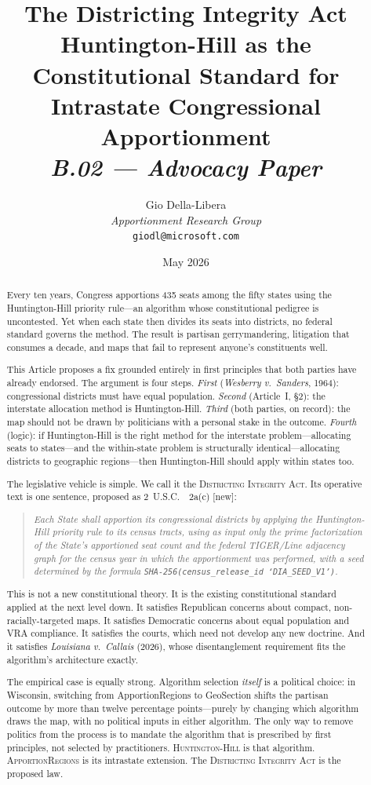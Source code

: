 \documentclass[12pt]{article}
\title{%
  \textbf{The Districting Integrity Act}\\[0.4em]
  \large Huntington-Hill as the Constitutional Standard for\\
  Intrastate Congressional Apportionment\\[0.8em]
  \normalsize\textit{B.02 --- Advocacy Paper}%
}
\author{%
  Gio Della-Libera\\
  \textit{Apportionment Research Group}\\
  \small\texttt{giodl@microsoft.com}
}
\date{May 2026}
\newcommand{\case}[1]{\textit{#1}}
\newcommand{\callais}{\case{Louisiana v.\ Callais}}
\newcommand{\wesberry}{\case{Wesberry v.\ Sanders}}
\newcommand{\dia}{\textsc{Districting Integrity Act}}
\newcommand{\hh}{\textsc{Huntington-Hill}}
\newcommand{\ar}{\textsc{ApportionRegions}}
\newcommand{\usca}{\textsection}
\begin{document}
\maketitle

\begin{abstract}
\noindent
Every ten years, Congress apportions 435 seats among the fifty states using
the Huntington-Hill priority rule---an algorithm whose constitutional
pedigree is uncontested.
Yet when each state then divides its seats into districts, no federal standard
governs the method.
The result is partisan gerrymandering, litigation that consumes a decade, and
maps that fail to represent anyone's constituents well.

This Article proposes a fix grounded entirely in first principles that both
parties have already endorsed.
The argument is four steps.
\emph{First} (\wesberry{}, 1964): congressional districts must have equal
population.
\emph{Second} (Article~I, \S2): the interstate allocation method is
Huntington-Hill.
\emph{Third} (both parties, on record): the map should not be drawn by
politicians with a personal stake in the outcome.
\emph{Fourth} (logic): if Huntington-Hill is the right method for the
interstate problem---allocating seats to states---and the within-state problem
is structurally identical---allocating districts to geographic regions---then
Huntington-Hill should apply within states too.

The legislative vehicle is simple.
We call it the \dia{}.
Its operative text is one sentence, proposed as 2~U.S.C.~\usca{}~2a(c) [new]:

\begin{quote}
  \itshape
  Each State shall apportion its congressional districts by applying the
  Huntington-Hill priority rule to its census tracts, using as input only the
  prime factorization of the State's apportioned seat count and the federal
  TIGER/Line adjacency graph for the census year in which the apportionment
  was performed, with a seed determined by the formula
  \texttt{SHA-256(census\_release\_id \textbar\textbar{} `DIA\_SEED\_V1')}.
\end{quote}

This is not a new constitutional theory.
It is the existing constitutional standard applied at the next level down.
It satisfies Republican concerns about compact, non-racially-targeted maps.
It satisfies Democratic concerns about equal population and VRA compliance.
It satisfies the courts, which need not develop any new doctrine.
And it satisfies \callais{} (2026), whose disentanglement requirement fits
the algorithm's architecture exactly.

The empirical case is equally strong.
Algorithm selection \emph{itself} is a political choice: in Wisconsin,
switching from ApportionRegions to GeoSection shifts the partisan outcome by
more than twelve percentage points---purely by changing which algorithm draws
the map, with no political inputs in either algorithm.
The only way to remove politics from the process is to mandate the algorithm
that is prescribed by first principles, not selected by practitioners.
\hh{} is that algorithm.
\ar{} is its intrastate extension.
The \dia{} is the proposed law.
\end{abstract}
\end{document}

